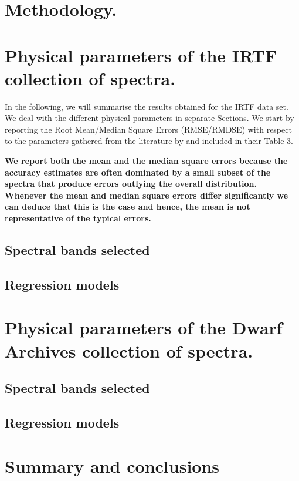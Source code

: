 \documentclass[a4paper,fleqn,usenatbib]{mnras}
\begin{document}
\section{Methodology.}
\label{sec:meth}


\section{Physical parameters of the IRTF collection of spectra.}
\label{sec:irtf}

In the following, we will summarise the results obtained for the IRTF
data set. We deal with the different physical parameters in separate
Sections. We start by reporting the Root Mean/Median Square Errors
(RMSE/RMDSE) with respect to the parameters gathered from the
literature by \cite{cesetti} and included in their Table 3.

\textbf{We report both the mean and the median square errors because
  the accuracy estimates are often dominated by a small subset of the
  spectra that produce errors outlying the overall
  distribution. Whenever the mean and median square errors differ
  significantly we can deduce that this is the case and hence, the
  mean is not representative of the typical errors.}

\subsection{Spectral bands selected}

\subsection{Regression models}


\section{Physical parameters of the Dwarf Archives collection of spectra.}
\label{sec:ipac}

\subsection{Spectral bands selected}

\subsection{Regression models}


\section{Summary and conclusions}
\label{sec:summary}

\end{document}

